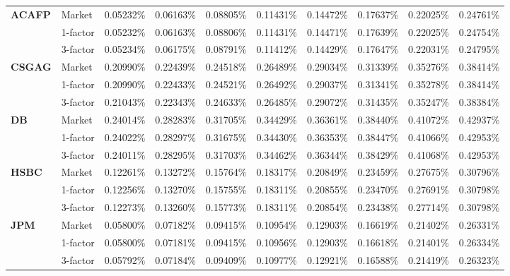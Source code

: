 \documentclass[12pt,a4paper]{article}
\theoremstyle{plain}
\numberwithin{equation}{section}
\begin{document}
\begin{table}[t]
{\begin{tabular}{|rl|cccccccc|}
    \midrule
    \midrule
    \multicolumn{1}{|l}{\textbf{ACAFP}} & Market & 0.05232\% & 0.06163\% & 0.08805\% & 0.11431\% & 0.14472\% & 0.17637\% & 0.22025\% & 0.24761\% \\
\cmidrule{3-10}          & 1-factor & 0.05232\% & 0.06163\% & 0.08806\% & 0.11431\% & 0.14471\% & 0.17639\% & 0.22025\% & 0.24754\% \\
          & 3-factor & 0.05234\% & 0.06175\% & 0.08791\% & 0.11412\% & 0.14429\% & 0.17647\% & 0.22031\% & 0.24795\% \\
    \midrule
    \midrule
    \multicolumn{1}{|l}{\textbf{CSGAG}} & Market & 0.20990\% & 0.22439\% & 0.24518\% & 0.26489\% & 0.29034\% & 0.31339\% & 0.35276\% & 0.38414\% \\
\cmidrule{3-10}          & 1-factor & 0.20990\% & 0.22433\% & 0.24521\% & 0.26492\% & 0.29037\% & 0.31341\% & 0.35278\% & 0.38414\% \\
          & 3-factor & 0.21043\% & 0.22343\% & 0.24633\% & 0.26485\% & 0.29072\% & 0.31435\% & 0.35247\% & 0.38384\% \\
    \midrule
    \midrule
    \multicolumn{1}{|l}{\textbf{DB}} & Market & 0.24014\% & 0.28283\% & 0.31705\% & 0.34429\% & 0.36361\% & 0.38440\% & 0.41072\% & 0.42937\% \\
\cmidrule{3-10}          & 1-factor & 0.24022\% & 0.28297\% & 0.31675\% & 0.34430\% & 0.36353\% & 0.38447\% & 0.41066\% & 0.42953\% \\
          & 3-factor & 0.24011\% & 0.28295\% & 0.31703\% & 0.34462\% & 0.36344\% & 0.38429\% & 0.41068\% & 0.42953\% \\
    \midrule
    \midrule
    \multicolumn{1}{|l}{\textbf{HSBC}} & Market & 0.12261\% & 0.13272\% & 0.15764\% & 0.18317\% & 0.20849\% & 0.23459\% & 0.27675\% & 0.30796\% \\
\cmidrule{3-10}          & 1-factor & 0.12256\% & 0.13270\% & 0.15755\% & 0.18311\% & 0.20855\% & 0.23470\% & 0.27691\% & 0.30798\% \\
          & 3-factor & 0.12273\% & 0.13260\% & 0.15773\% & 0.18311\% & 0.20854\% & 0.23438\% & 0.27714\% & 0.30798\% \\
    \midrule
    \midrule
    \multicolumn{1}{|l}{\textbf{JPM}} & Market & 0.05800\% & 0.07182\% & 0.09415\% & 0.10954\% & 0.12903\% & 0.16619\% & 0.21402\% & 0.26331\% \\
\cmidrule{3-10}          & 1-factor & 0.05800\% & 0.07181\% & 0.09415\% & 0.10956\% & 0.12903\% & 0.16618\% & 0.21401\% & 0.26334\% \\
          & 3-factor & 0.05792\% & 0.07184\% & 0.09409\% & 0.10977\% & 0.12921\% & 0.16588\% & 0.21419\% & 0.26323\% \\

\end{tabular}}
\end{table}
\end{document}
